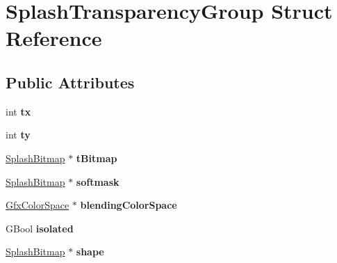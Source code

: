 \hypertarget{struct_splash_transparency_group}{}\section{Splash\+Transparency\+Group Struct Reference}
\label{struct_splash_transparency_group}
\subsection*{Public Attributes}
\begin{DoxyCompactItemize}
\item 
\mbox{\label{struct_splash_transparency_group_a285dd7d2a0c7a8b69f90e8d22922720e}} 
int {\bfseries tx}
\item 
\mbox{\label{struct_splash_transparency_group_a84c23d89990a51c888f1e68c2637a166}} 
int {\bfseries ty}
\item 
\mbox{\label{struct_splash_transparency_group_ad1be2416a51e4931d904b0ecc75d5110}} 
\hyperlink{class_splash_bitmap}{Splash\+Bitmap} $\ast$ {\bfseries t\+Bitmap}
\item 
\mbox{\label{struct_splash_transparency_group_af3afd37a05e4291ddde313c4b8b25d8b}} 
\hyperlink{class_splash_bitmap}{Splash\+Bitmap} $\ast$ {\bfseries softmask}
\item 
\mbox{\label{struct_splash_transparency_group_ac0765554a780dea76fc465703f58e5a5}} 
\hyperlink{class_gfx_color_space}{Gfx\+Color\+Space} $\ast$ {\bfseries blending\+Color\+Space}
\item 
\mbox{\label{struct_splash_transparency_group_a956f069a8de3785301b32253145db58c}} 
G\+Bool {\bfseries isolated}
\item 
\mbox{\label{struct_splash_transparency_group_a670468412452567ee6c91dd55be0b106}} 
\hyperlink{class_splash_bitmap}{Splash\+Bitmap} $\ast$ {\bfseries shape}
\item 
\mbox{\label{struct_splash_transparency_group_a4b0dbf672d958bd06dfc4298ff2ffb70}} 

\end{DoxyCompactItemize}
